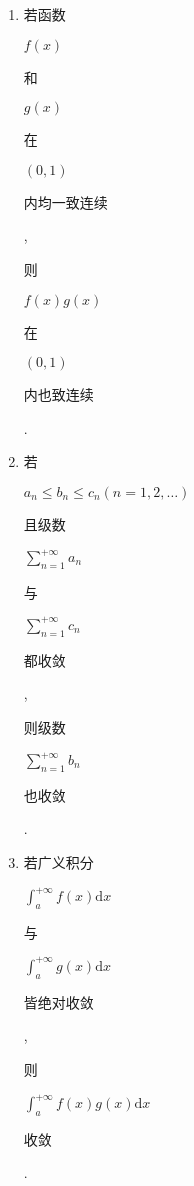 \documentclass[10pt]{article}
\begin{document}
\begin{enumerate}
  \item \begin{CJK}{UTF8}{mj}若函数\end{CJK} $f(x)$ \begin{CJK}{UTF8}{mj}和\end{CJK} $g(x)$ \begin{CJK}{UTF8}{mj}在\end{CJK} $(0,1)$ \begin{CJK}{UTF8}{mj}内均一致连续\end{CJK}, \begin{CJK}{UTF8}{mj}则\end{CJK} $f(x) g(x)$ \begin{CJK}{UTF8}{mj}在\end{CJK} $(0,1)$ \begin{CJK}{UTF8}{mj}内也致连续\end{CJK}.

  \item \begin{CJK}{UTF8}{mj}若\end{CJK} $a_{n} \leqslant b_{n} \leqslant c_{n}(n=1,2, \ldots)$ \begin{CJK}{UTF8}{mj}且级数\end{CJK} $\sum_{n=1}^{+\infty} a_{n}$ \begin{CJK}{UTF8}{mj}与\end{CJK} $\sum_{n=1}^{+\infty} c_{n}$ \begin{CJK}{UTF8}{mj}都收敛\end{CJK}, \begin{CJK}{UTF8}{mj}则级数\end{CJK} $\sum_{n=1}^{+\infty} b_{n}$ \begin{CJK}{UTF8}{mj}也收敛\end{CJK}.

  \item \begin{CJK}{UTF8}{mj}若广义积分\end{CJK} $\int_{a}^{+\infty} f(x) \mathrm{d} x$ \begin{CJK}{UTF8}{mj}与\end{CJK} $\int_{a}^{+\infty} g(x) \mathrm{d} x$ \begin{CJK}{UTF8}{mj}皆绝对收敛\end{CJK}, \begin{CJK}{UTF8}{mj}则\end{CJK} $\int_{a}^{+\infty} f(x) g(x) \mathrm{d} x$ \begin{CJK}{UTF8}{mj}收敛\end{CJK}.

\end{enumerate}
\end{document}
